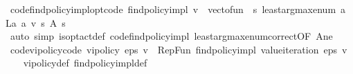\begin{isabellebody}
%
\isadelimproof
\isanewline
%
\endisadelimproof
\isanewline
{}\isamarkupfalse%
\ code{\isacharunderscore}{\kern0pt}find{\isacharunderscore}{\kern0pt}policy{\isacharunderscore}{\kern0pt}impl{\isacharunderscore}{\kern0pt}opt{\isacharbrackleft}{\kern0pt}code{\isacharbrackright}{\kern0pt}{\isacharcolon}{\kern0pt}\ {\isachardoublequoteopen}find{\isacharunderscore}{\kern0pt}policy{\isacharunderscore}{\kern0pt}impl\ v\ {\isacharequal}{\kern0pt}\ vec{\isacharunderscore}{\kern0pt}to{\isacharunderscore}{\kern0pt}fun\ {\isacharparenleft}{\kern0pt}{\isasymchi}\ s{\isachardot}{\kern0pt}\ least{\isacharunderscore}{\kern0pt}arg{\isacharunderscore}{\kern0pt}max{\isacharunderscore}{\kern0pt}enum\ {\isacharparenleft}{\kern0pt}{\isasymlambda}a{\isachardot}{\kern0pt}\ L\isactrlsub a\ a\ v\ s{\isacharparenright}{\kern0pt}\ {\isacharparenleft}{\kern0pt}A\ s{\isacharparenright}{\kern0pt}{\isacharparenright}{\kern0pt}{\isachardoublequoteclose}\ \isanewline
%
\isadelimproof
\ \ %
\endisadelimproof
%
\isatagproof
{}\isamarkupfalse%
\ {\isacharparenleft}{\kern0pt}auto\ simp{\isacharcolon}{\kern0pt}\ is{\isacharunderscore}{\kern0pt}opt{\isacharunderscore}{\kern0pt}act{\isacharunderscore}{\kern0pt}def\ code{\isacharunderscore}{\kern0pt}find{\isacharunderscore}{\kern0pt}policy{\isacharunderscore}{\kern0pt}impl\ least{\isacharunderscore}{\kern0pt}arg{\isacharunderscore}{\kern0pt}max{\isacharunderscore}{\kern0pt}enum{\isacharunderscore}{\kern0pt}correct{\isacharbrackleft}{\kern0pt}OF\ A{\isacharunderscore}{\kern0pt}ne{\isacharbrackright}{\kern0pt}{\isacharparenright}{\kern0pt}%
\endisatagproof
{\isafoldproof}%
%
\isadelimproof
\isanewline
%
\endisadelimproof
\isanewline
{}\isamarkupfalse%
\ code{\isacharunderscore}{\kern0pt}vi{\isacharunderscore}{\kern0pt}policy{\isacharprime}{\kern0pt}{\isacharbrackleft}{\kern0pt}code{\isacharbrackright}{\kern0pt}{\isacharcolon}{\kern0pt}\ {\isachardoublequoteopen}vi{\isacharunderscore}{\kern0pt}policy{\isacharprime}{\kern0pt}\ eps\ v\ {\isacharequal}{\kern0pt}\ Rep{\isacharunderscore}{\kern0pt}Fun\ {\isacharparenleft}{\kern0pt}find{\isacharunderscore}{\kern0pt}policy{\isacharunderscore}{\kern0pt}impl\ {\isacharparenleft}{\kern0pt}value{\isacharunderscore}{\kern0pt}iteration\ eps\ v{\isacharparenright}{\kern0pt}{\isacharparenright}{\kern0pt}{\isachardoublequoteclose}\ \isanewline
%
\isadelimproof
\ \ %
\endisadelimproof
%
\isatagproof
{}\isamarkupfalse%
\ vi{\isacharunderscore}{\kern0pt}policy{\isacharprime}{\kern0pt}{\isacharunderscore}{\kern0pt}def\ find{\isacharunderscore}{\kern0pt}policy{\isacharunderscore}{\kern0pt}impl{\isacharunderscore}{\kern0pt}def\ \isamarkupfalse%

\end{isabellebody}
